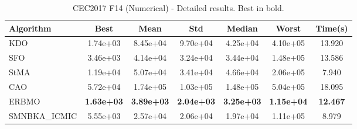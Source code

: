\begin{table}[H]
\centering\small
\caption{CEC2017 F14 (Numerical) - Detailed results. Best in bold.}
\label{tab:cec2017_F14}
\begin{tabular}{lcccccc}
\toprule
\textbf{Algorithm} & \textbf{Best} & \textbf{Mean} & \textbf{Std} & \textbf{Median} & \textbf{Worst} & \textbf{Time(s)} \\
\midrule
KDO & 1.74e+03 & 8.45e+04 & 9.70e+04 & 4.25e+04 & 4.10e+05 & 13.920 \\
SFO & 3.46e+03 & 4.14e+04 & 3.24e+04 & 3.44e+04 & 1.48e+05 & 13.586 \\
StMA & 1.19e+04 & 5.07e+04 & 3.41e+04 & 4.66e+04 & 2.06e+05 & 7.940 \\
CAO & 5.72e+04 & 1.74e+05 & 1.03e+05 & 1.48e+05 & 5.04e+05 & 18.095 \\
ERBMO & \textbf{1.63e+03} & \textbf{3.89e+03} & \textbf{2.04e+03} & \textbf{3.25e+03} & \textbf{1.15e+04} & \textbf{12.467} \\
SMNBKA_ICMIC & 5.55e+03 & 2.57e+04 & 2.06e+04 & 1.97e+04 & 1.11e+05 & 8.979 \\
\bottomrule
\end{tabular}
\end{table}

